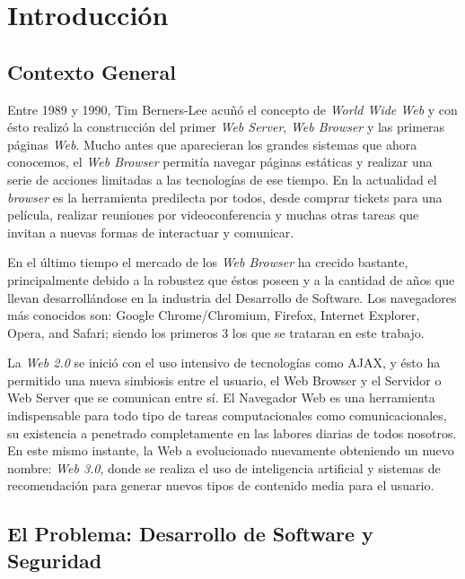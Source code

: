 


\chapter{Introducción}
\label{chap1:intro}

\section{Contexto General}
\label{chap1:CG}

Entre 1989 y 1990, Tim Berners-Lee acuñó el concepto de \textit{World Wide Web} y con ésto realizó la construcción del primer \textit{Web Server}, \textit{Web Browser} y las primeras páginas \textit{Web}. Mucho antes que aparecieran los grandes sistemas que ahora conocemos, el \textit{Web Browser} permitía navegar páginas estáticas y realizar una serie de acciones limitadas a las tecnologías de ese tiempo. En la actualidad el \textit{browser} es la herramienta predilecta por todos, desde comprar tickets para una película, realizar reuniones por videoconferencia y muchas otras tareas que invitan a nuevas formas de interactuar y comunicar.

En el último tiempo el mercado de los \textit{Web Browser} ha crecido bastante, principalmente debido a la robustez que éstos poseen y a la cantidad de años que llevan desarrollándose en la industria del Desarrollo de Software. Los navegadores más conocidos son: Google Chrome/Chromium, Firefox, Internet Explorer, Opera, and Safari; siendo los primeros 3 los que se trataran en este trabajo.

La \textit{Web 2.0} se inició con el uso intensivo de tecnologías como AJAX, y ésto ha permitido una nueva simbiosis entre el usuario, el Web Browser y el Servidor o Web Server que se comunican entre sí. El Navegador Web es una herramienta indispensable para todo tipo de tareas computacionales como comunicacionales, su existencia a penetrado completamente en las labores diarias de todos nosotros. En este mismo instante, la Web a evolucionado nuevamente obteniendo un nuevo nombre: \textit{Web 3.0}, donde se realiza el uso de inteligencia artificial y sistemas de recomendación para generar nuevos tipos de contenido media para el usuario.


\section{El Problema: Desarrollo de Software y Seguridad}
\label{chap1:SD_SS}

